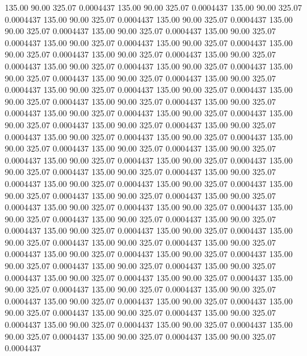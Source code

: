  135.00   90.00  325.07   0.0004437
 135.00   90.00  325.07   0.0004437
 135.00   90.00  325.07   0.0004437
 135.00   90.00  325.07   0.0004437
 135.00   90.00  325.07   0.0004437
 135.00   90.00  325.07   0.0004437
 135.00   90.00  325.07   0.0004437
 135.00   90.00  325.07   0.0004437
 135.00   90.00  325.07   0.0004437
 135.00   90.00  325.07   0.0004437
 135.00   90.00  325.07   0.0004437
 135.00   90.00  325.07   0.0004437
 135.00   90.00  325.07   0.0004437
 135.00   90.00  325.07   0.0004437
 135.00   90.00  325.07   0.0004437
 135.00   90.00  325.07   0.0004437
 135.00   90.00  325.07   0.0004437
 135.00   90.00  325.07   0.0004437
 135.00   90.00  325.07   0.0004437
 135.00   90.00  325.07   0.0004437
 135.00   90.00  325.07   0.0004437
 135.00   90.00  325.07   0.0004437
 135.00   90.00  325.07   0.0004437
 135.00   90.00  325.07   0.0004437
 135.00   90.00  325.07   0.0004437
 135.00   90.00  325.07   0.0004437
 135.00   90.00  325.07   0.0004437
 135.00   90.00  325.07   0.0004437
 135.00   90.00  325.07   0.0004437
 135.00   90.00  325.07   0.0004437
 135.00   90.00  325.07   0.0004437
 135.00   90.00  325.07   0.0004437
 135.00   90.00  325.07   0.0004437
 135.00   90.00  325.07   0.0004437
 135.00   90.00  325.07   0.0004437
 135.00   90.00  325.07   0.0004437
 135.00   90.00  325.07   0.0004437
 135.00   90.00  325.07   0.0004437
 135.00   90.00  325.07   0.0004437
 135.00   90.00  325.07   0.0004437
 135.00   90.00  325.07   0.0004437
 135.00   90.00  325.07   0.0004437
 135.00   90.00  325.07   0.0004437
 135.00   90.00  325.07   0.0004437
 135.00   90.00  325.07   0.0004437
 135.00   90.00  325.07   0.0004437
 135.00   90.00  325.07   0.0004437
 135.00   90.00  325.07   0.0004437
 135.00   90.00  325.07   0.0004437
 135.00   90.00  325.07   0.0004437
 135.00   90.00  325.07   0.0004437
 135.00   90.00  325.07   0.0004437
 135.00   90.00  325.07   0.0004437
 135.00   90.00  325.07   0.0004437
 135.00   90.00  325.07   0.0004437
 135.00   90.00  325.07   0.0004437
 135.00   90.00  325.07   0.0004437
 135.00   90.00  325.07   0.0004437
 135.00   90.00  325.07   0.0004437
 135.00   90.00  325.07   0.0004437
 135.00   90.00  325.07   0.0004437
 135.00   90.00  325.07   0.0004437
 135.00   90.00  325.07   0.0004437
 135.00   90.00  325.07   0.0004437
 135.00   90.00  325.07   0.0004437
 135.00   90.00  325.07   0.0004437
 135.00   90.00  325.07   0.0004437
 135.00   90.00  325.07   0.0004437
 135.00   90.00  325.07   0.0004437
 135.00   90.00  325.07   0.0004437
 135.00   90.00  325.07   0.0004437
 135.00   90.00  325.07   0.0004437
 135.00   90.00  325.07   0.0004437
